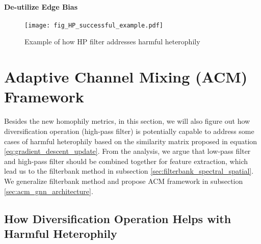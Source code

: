 \documentclass{article}
\newcommand{\0}{{\boldsymbol{0}}}
\newcommand{\6}{{\partial}}
\newcommand{\8}{{\infty}}
\newcommand{\4}{{\nabla}}
\begin{document}
\paragraph{De-utilize Edge Bias}
\fi











\begin{figure}[htbp]
\centering
{
\captionsetup{justification = centering}
\texttt{[image: fig\_HP\_successful\_example.pdf]}}
{\caption{Example of how HP filter addresses harmful heterophily}\label{fig:successful_example_hp_filter}
}
\end{figure}
\section{Adaptive Channel Mixing (ACM) Framework}
\label{sec:acm_framework}
Besides the new homophily metrics, in this section, we will also figure out how diversification operation (high-pass filter) is potentially capable to address some cases of harmful heterophily based on the similarity matrix proposed in equation \eqref{eq:gradient_descent_update}. From the analysis, we argue that low-pass filter and high-pass filter should be combined together for feature extraction, which lead us to the filterbank method in subsection \ref{sec:filterbank_spectral_spatial}. We generalize filterbank method and propose ACM framework in subsection \ref{sec:acm_gnn_architecture}.
 
\subsection{How Diversification Operation Helps with Harmful Heterophily}
\end{document}
